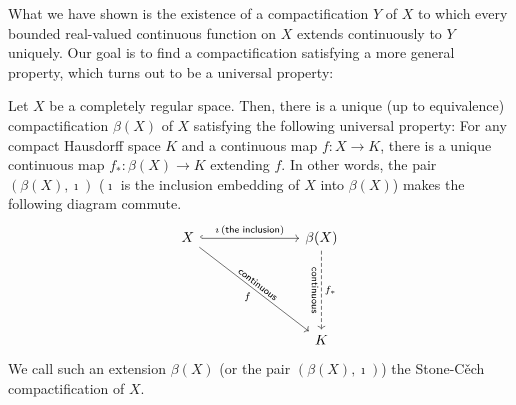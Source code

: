 What we have shown is the existence of a compactification $Y$ of $X$ to which every bounded real-valued continuous function on $X$ extends continuously to $Y$ uniquely.
Our goal is to find a compactification satisfying a more general property, which turns out to be a universal property:
\begin{thm}
    Let $X$ be a completely regular space.
    Then, there is a unique (up to equivalence) compactification $\beta(X)$ of $X$ satisfying the following universal property:
    For any compact Hausdorff space $K$ and a continuous map $f: X\rightarrow K$, there is a unique continuous map $f_*: \beta(X)\rightarrow K$ extending $f$.
    In other words, the pair $(\beta(X), \imath)$ ($\imath$ is the inclusion embedding of $X$ into $\beta(X)$) makes the following diagram commute.
    \begin{equation*}
        \begin{tikzcd}[row sep=2.0cm, column sep=2.5cm]
            X
            \arrow[dr, "\textsf{continuous}"{sloped}, "f"']
            \arrow[r, "\imath\,(\textsf{the inclusion})", hook] &
            \beta(X)
            \arrow[d, "\textsf{continuous}"'{sloped}, "f_*", dashed] \\
            & K
        \end{tikzcd}
    \end{equation*}
    We call such an extension $\beta(X)$ (or the pair $(\beta(X), \imath)$) the Stone-C\v{e}ch compactification of $X$.
\end{thm}

